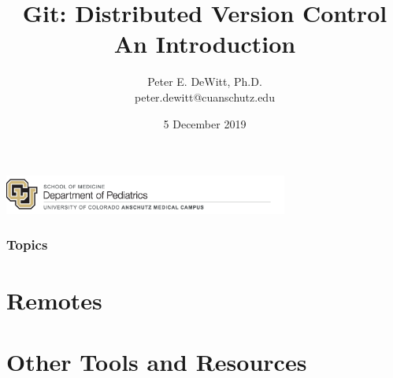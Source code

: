 \documentclass{beamer}
\author[Peter E. DeWitt]{Peter E. DeWitt, Ph.D.\inst{1} \\ peter.dewitt@cuanschutz.edu}
\institute[]{SOM | Department of Pediatrics | Informatics and Data Science}
\title[Intro to Git]{Git: Distributed Version Control \\ {\small An Introduction}}
\date{5 December 2019}
\begin{document}
  \begin{frame}[t,plain]
    \titlepage
    \includegraphics[width=0.7\textwidth]{som_pediatrics}
  \end{frame}

  \begin{frame}[t]
    \frametitle{Topics}
    \tableofcontents[hideallsubsections]
  \end{frame}

 
 
 

 \section{Remotes}
  \begin{frame}
    \frametitle{}
  \end{frame}

 \section{Other Tools and Resources}
  \begin{frame}
    \frametitle{}
  \end{frame}
\end{document}
